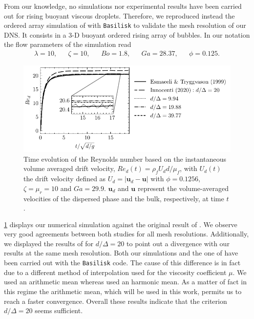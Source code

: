 From our knowledge, no simulations nor experimental results have been carried out for rising buoyant viscous droplets. 
Therefore, we reproduced instead the ordered array simulation of \citet{esmaeeli1999direct} with \texttt{Basilisk} to validate the mesh resolution of our DNS.  
It consists in a 3-D buoyant ordered rising array of bubbles. 
In our notation the flow parameters of the simulation read 
\begin{align*}
    \lambda = 10,
    && \zeta = 10,
    && Bo = 1.8,
    && Ga = 28.37,
    && \phi = 0.125.
\end{align*}
\begin{figure}[h!]
    \centering
    \includegraphics[height = 0.3\textwidth]{image/VALIDATION2.0/Loisy/Re.pdf}
    \caption{Time evolution of the Reynolds number based on the instantaneous volume averaged drift velocity, $Re_d(t) = \rho_fU _dd /\mu_f$, with $U_d(t)$ the drift velocity defined as $U_d = |\textbf{u}_d - \textbf{u}|$ with $\phi = 0.1256$, $\zeta =\mu_r =10$ and $Ga = 29.9$. $\textbf{u}_d$ and $\textbf{u}$ represent the volume-averaged velocities of the dispersed phase and the bulk, respectively, at time $t$.}
    \label{fig:ordered_array}
\end{figure}
\ref{fig:ordered_array} displays our numerical simulation against the original result of \citet{esmaeeli1999direct}.
We observe very good agreements between both studies for all mesh resolutions.
Additionally, we displayed the results of \citet{innocenti2020direct} for $d/\Delta = 20$ to point out a divergence with our results at the same mesh resolution.  
Both our simulations and the one of \citet{innocenti2020direct} have been carried out with the  \texttt{Basilisk} code. 
The cause of this difference is in fact due to a different method of interpolation used for the viscosity coefficient $\mu$. 
We used an arithmetic mean whereas \citet{innocenti2020direct} used an 
harmonic mean.
As a matter of fact in this regime the arithmetic mean, which will be used in this work, permits us to reach a faster convergence. 
Overall these results indicate that the criterion $d/\Delta = 20$ seems sufficient.%


